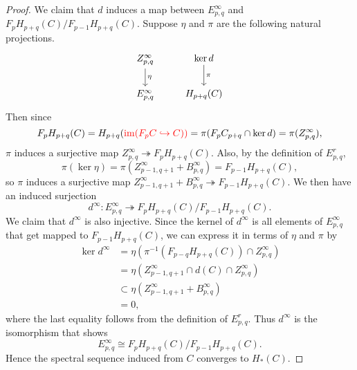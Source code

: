 \documentclass[twoside,10pt]{article}
\begin{document}
\begin{proof}
We claim that $d$ induces a map between $E^{\infty}_{p,q}$ and $F_{p}H_{p+q}(C)/F_{p-1}H_{p+q}(C)$. Suppose $\eta$ and $\pi$ are the following natural projections.
\[
	\begin{tikzcd}
		Z^{\infty}_{p,q}\dar{\eta}&\ker d\dar{\pi}\\
		E^{\infty}_{p,q}&H_{p+q}(C)
	\end{tikzcd}
\] Then since
\[
	F_{p}H_{p+q}(C) = H_{p+q}( {\color{red} \operatorname{im}(F_{p}C \hookrightarrow C))} = \pi(F_{p}C_{p+q}\cap \ker d)=\pi(Z^{\infty}_{p,q}),
\] 
$\pi$ induces a surjective map $Z^{\infty}_{p,q}\twoheadrightarrow F_{p}H_{p+q}(C)$. Also, by the definition of $E_{p,q}^{r}$,
\[
	\pi(\ker \eta) = \pi(Z^{\infty}_{p-1,q+1}+B^{\infty}_{p,q}) = F_{p-1}H_{p+q}(C),
\] so $\pi$ induces a surjective map $Z^{\infty}_{p-1,q+1}+B^{\infty}_{p,q} \twoheadrightarrow F_{p-1}H_{p+q}(C)$. We then have an induced surjection
\[
	d^{\infty} : E_{p,q}^{\infty} \twoheadrightarrow F_{p}H_{p+q}(C) / F_{p-1}H_{p+q}(C).
\] We claim that $d^{\infty}$ is also injective. Since the kernel of $d^{\infty}$ is all elements of $E_{p,q}^{\infty}$ that get mapped to $F_{p-1}H_{p+q}(C)$, we can express it in terms of $\eta$ and $\pi$ by
\begin{align*}
	\ker d^{\infty} &= \eta\left( \pi^{-1}\left( F_{p-q}H_{p+q}(C) \right) \cap Z_{p,q}^{\infty} \right)\\
			&= \eta\left( Z^{\infty}_{p-1,q+1} \cap d(C) \cap Z_{p,q}^{\infty} \right) \\
			&\subset \eta\left( Z^{\infty}_{p-1,q+1} + B_{p,q}^{\infty} \right) \\
			&= 0,
\end{align*}
where the last equality follows from the definition of $E_{p,q}^{r}$. Thus $d^{\infty}$ is the isomorphism that shows
\[
	E_{p,q}^{\infty} \cong F_{p}H_{p+q}(C) / F_{p-1}H_{p+q}(C).
\] 
Hence the spectral sequence induced from $C$ converges to $H_{*}(C)$.
\end{proof}

\vspace{10mm}
\end{document}
